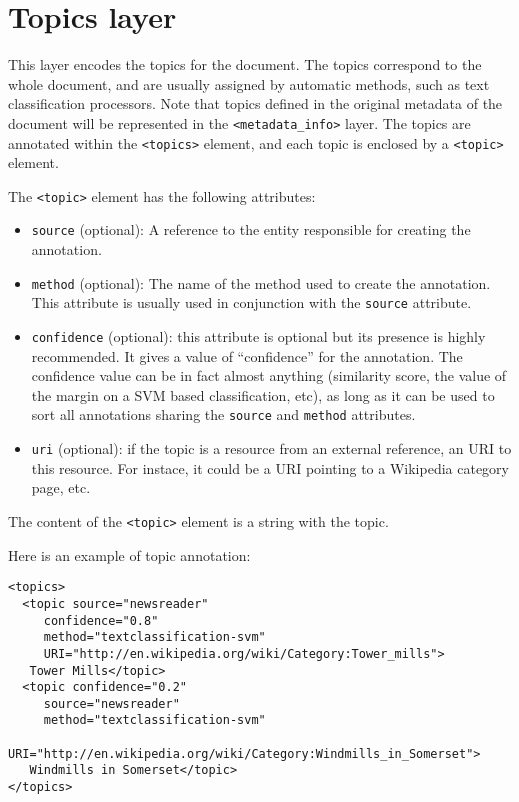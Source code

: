 
\section{Topics layer}
\label{sec:topics-layer}

This layer encodes the topics for the document. The topics correspond
to the whole document, and are usually assigned by automatic methods,
such as text classification processors. Note that topics defined in the original metadata of the document will be represented in the \texttt{<metadata\_info>} layer. 
The topics are annotated within the \texttt{<topics>} element, and each topic is enclosed by a
\texttt{<topic>} element.

The \texttt{<topic>} element has the following attributes:
\begin{itemize}
\item \texttt{source} (optional): A reference to the entity
  responsible for creating the annotation.
\item \texttt{method} (optional): The name of the method used to
  create the annotation. This attribute is usually used in conjunction
  with the \texttt{source} attribute.
\item \texttt{confidence} (optional): this attribute is optional but
  its presence is highly recommended. It gives a value of
  ``confidence'' for the annotation. The confidence value can be in
  fact almost anything (similarity score, the value of the margin on a
  SVM based classification, etc), as long as it can be used to sort
  all annotations sharing the \texttt{source} and \texttt{method}
  attributes.
\item \texttt{uri} (optional): if the topic is a resource
  from an external reference, an URI to this resource. For instace, it
  could be a URI pointing to a Wikipedia category page, etc.
\end{itemize}

The content of the \texttt{<topic>} element is a string with the
topic.

Here is an example of topic annotation:

\begin{Verbatim}
<topics>
  <topic source="newsreader"
	 confidence="0.8"
	 method="textclassification-svm"
	 URI="http://en.wikipedia.org/wiki/Category:Tower_mills">
   Tower Mills</topic>
  <topic confidence="0.2"
	 source="newsreader"
	 method="textclassification-svm"
	 URI="http://en.wikipedia.org/wiki/Category:Windmills_in_Somerset">
   Windmills in Somerset</topic>
</topics>
\end{Verbatim}


